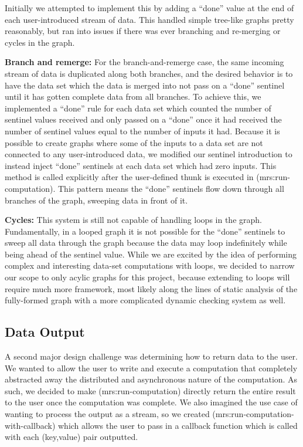 \documentclass{article}
\begin{document}
Initially we attempted to implement this by adding a ``done'' value at the
end of each user-introduced stream of data. This handled simple tree-like
graphs pretty reasonably, but ran into issues if there was ever branching and
re-merging or cycles in the graph.

\textbf{Branch and remerge:} For the branch-and-remerge case, the same
incoming stream of data is duplicated along both branches, and the desired
behavior is to have the data set which the data is merged into not pass on
a ``done'' sentinel until it has gotten complete data from all branches.
To achieve this, we implemented a ``done'' rule for each data set which
counted the number of sentinel values received and only passed on a ``done''
once it had received the number of sentinel values equal to the number of
inputs it had. Because it is possible to create graphs where some of the
inputs to a data set are not connected to any user-introduced data, we
modified our sentinel introduction to instead inject ``done'' sentinels
at each data set which had zero inputs. This method is called explicitly
after the user-defined thunk is executed in (mrs:run-computation). This
pattern means the ``done'' sentinels flow down through all branches of
the graph, sweeping data in front of it.

\textbf{Cycles:} This system is still not capable of handling loops in the graph.
Fundamentally,
in a looped graph it is not possible for the ``done'' sentinels to sweep
all data through the graph because the data may loop indefinitely while being
ahead of the sentinel value. While we are excited by the idea of performing
complex and interesting data-set computations with loops, we decided to
narrow our scope to only acylic graphs for this project, because extending
to loops will require much more framework, most likely along the lines of
static analysis of the fully-formed graph with a more complicated dynamic
checking system as well.

\subsection{Data Output}

A second major design challenge was determining how to return data to the user.
We wanted to allow the user to write and execute a computation that completely
abstracted away the distributed and asynchronous nature of the computation. As
such, we decided to make (mrs:run-computation) directly return the entire
result to the user once the computation was complete. We also imagined the use
case of wanting to process the output as a stream, so we created (mrs:run-computation-with-callback)
which allows the user to pass in a callback function which is called with each
(key,value) pair outputted.
\end{document}
